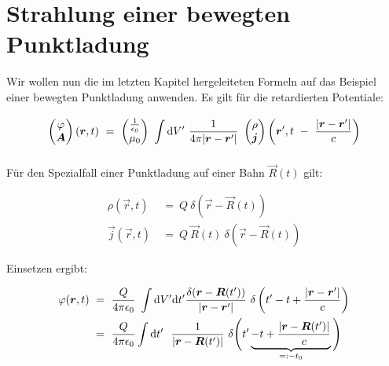 \section{Strahlung einer bewegten Punktladung}

Wir wollen nun die im letzten Kapitel hergeleiteten Formeln auf das Beispiel einer bewegten Punktladung anwenden. Es gilt für die retardierten Potentiale:

\begin{equation*}
\begin{pmatrix}
\varphi\\
\bm{A}
\end{pmatrix}
\left(\bm{r},t\right) \ = \ \begin{pmatrix}
\frac{1}{\epsilon_0}\\
\mu_0
\end{pmatrix}
\ \int\limits_{{}}^{{}}\mathrm{d}{V'}\ \frac{1}{4\pi|\bm{r}-\bm{r}'|} \ \begin{pmatrix}
\rho\\
\bm{j}
\end{pmatrix}
\left(\bm{r}', t \ - \ \frac{|\bm{r}-\bm{r}'|}{c}\right)
\end{equation*}

Für den Spezialfall einer Punktladung auf einer Bahn $\vec{R}(t)$ gilt:

\begin{align*}
\rho(\vec{r},t)  \ &= \ Q \ \delta\left(\vec{r}-\vec{R}(t)\right)\\
\vec{j}(\vec{r},t)  \ &= \ Q \ \vec{R}(t) \ \delta\left(\vec{r}-\vec{R}(t)\right) 
\end{align*}

Einsetzen ergibt:

\begin{align*}
\varphi(\vec{r},t)  \ &= \ \frac{Q}{4\pi\epsilon_0} \ \int\d V'\d t' \frac{\delta(\vec{r}-\vec{R}(t'))}{|\vec{r}-\vec{r}'|} \ \delta\left(t'-t + \frac{|\vec{r}-\vec{r}'|}{c}\right) \\ 
&= \ \frac{Q}{4\pi\epsilon_0}\Int{}{}{t'} \ \frac{1}{|\vec{r}-\vec{R}(t')|} \ \delta \Bigg(t'\underbrace{-t+\frac{|\vec{r}-\vec{R}(t')|}{c}}_{=: -t_0}\Bigg)
\end{align*}

